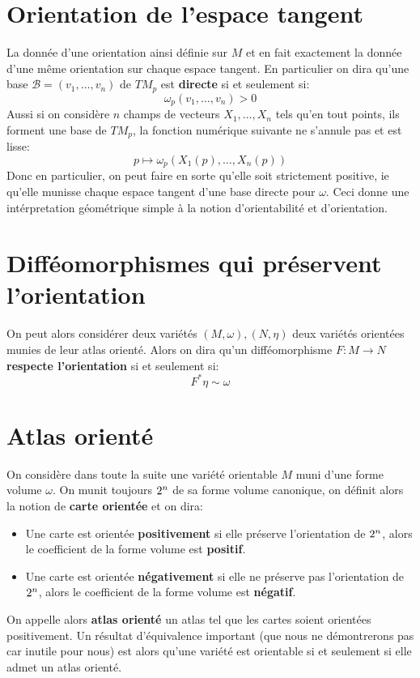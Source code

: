    \section{Orientation de l'espace tangent}
   La donnée d'une orientation ainsi définie sur \( M \) et en fait exactement la donnée d'une même orientation sur chaque espace tangent. En particulier on dira qu'une base \( \mathcal{B} = (v_1, \ldots, v_n) \) de \( TM_p \) est \textbf{directe} si et seulement si:
   \[ 
      \omega_p(v_1, \ldots, v_n) > 0
   \]
   Aussi si on considère \( n \) champs de vecteurs \( X_1, \ldots, X_n \) tels qu'en tout points, ils forment une base de \( TM_p \), la fonction numérique suivante ne s'annule pas et est lisse:
   \[ 
      p \longmapsto \omega_p(X_1(p), \ldots, X_n(p)) 
   \]
   Donc en particulier, on peut faire en sorte qu'elle soit strictement positive, ie qu'elle munisse chaque espace tangent d'une base directe pour \( \omega\). Ceci donne une intérpretation géométrique simple à la notion d'orientabilité et d'orientation.
   \section{Difféomorphismes qui préservent l'orientation}
      On peut alors considérer deux variétés \( (M, \omega), (N, \eta) \) deux variétés orientées munies de leur atlas orienté. Alors on dira qu'un difféomorphisme \( F : M \longrightarrow N \) \textbf{respecte l'orientation} si et seulement si:
      \[ 
         F^*\eta \sim \omega
      \]
   \section{Atlas orienté}
      On considère dans toute la suite une variété orientable \( M \) muni d'une forme volume \( \omega \). On munit toujours \( 2^n \) de sa forme volume canonique, on définit alors la notion de \textbf{carte orientée} et on dira:
      \begin{itemize}
         \item Une carte est orientée \textbf{positivement} si elle préserve l'orientation de \( 2^n \), alors le coefficient de la forme volume est \textbf{positif}.
         \item Une carte est orientée \textbf{négativement} si elle ne préserve pas l'orientation de \( 2^n \), alors le coefficient de la forme volume est \textbf{négatif}.
      \end{itemize}
      On appelle alors \textbf{atlas orienté} un atlas tel que les cartes soient orientées positivement. Un résultat d'équivalence important (que nous ne démontrerons pas car inutile pour nous) est alors qu'une variété est orientable si et seulement si elle admet un atlas orienté.
